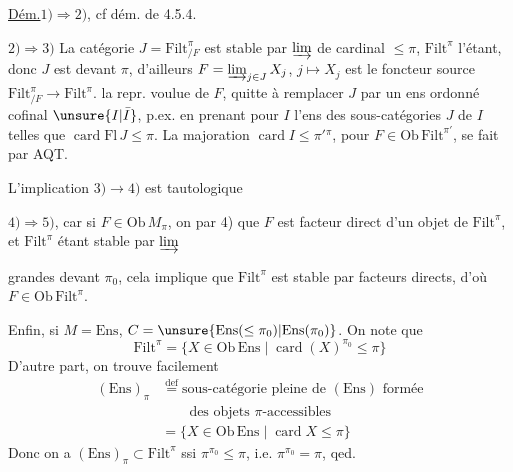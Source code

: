 \uline{Dém.}\quad $1)\Rightarrow2)$, cf dém. de 4.5.4.

$2)\Rightarrow3)$ La catégorie $J=\mathrm{Filt}^{\pi}_{/F}$ est stable par $\varinjlim$ de cardinal $\leq\pi$, $\mathrm{Filt}^{\pi}$ l'étant, donc $J$ est  devant $\pi$, d'ailleurs $F=\varinjlim_{j\in J}X_j$,  $j\longmapsto X_j$ est le foncteur source $\mathrm{Filt}^{\pi}_{/F}\longrightarrow\mathrm{Filt}^{\pi}$.  la repr. voulue de $F$, quitte à remplacer $J$ par un ens ordonné cofinal $\unsure{I|\bar I}$, p.ex. en prenant pour $I$ l'ens des sous-catégories   $J$ de $I$   \deleted{$\leq\pi$} telles que $\operatorname{card}\mathrm{Fl}\,J\leq\pi$. La majoration $\operatorname{card}I\leq\pi'{}^\pi$, pour $F\in\mathrm{Ob}\,\mathrm{Filt}^{\pi'}$, se fait par AQT.

L'implication $3)\longrightarrow4)$ est tautologique

$4)\Rightarrow5)$, car si $F\in\mathrm{Ob}\,M_\pi$, on  par 4) que $F$ est facteur direct d'un objet de $\mathrm{Filt}^{\pi}$, et $\mathrm{Filt}^{\pi}$ étant stable par $\varinjlim$

grandes devant $\pi_0$, cela implique que $\mathrm{Filt}^{\pi}$ est stable par facteurs directs, d'où $F\in\mathrm{Ob}\,\mathrm{Filt}^{\pi}$.

Enfin, si $M=\mathrm{Ens}$, $C=\unsure{\mathrm{Ens}(\leq\pi_0)|\mathrm{Ens}(\pi_0)}$. On note que
\[
\mathrm{Filt}^{\pi}=\{X\in\mathrm{Ob}\,\mathrm{Ens}\mid\operatorname{card}(X)^{\pi_0}\leq\pi\}
\]
D'autre part, on trouve facilement
\[
\begin{aligned}
(\mathrm{Ens})_\pi&\overset{\mathrm{def}}=\text{sous-catégorie pleine de }(\mathrm{Ens})\text{ formée}\\
&\qquad\text{des objets }\pi\text{-accessibles}\\
&=\{X\in\mathrm{Ob}\,\mathrm{Ens}\mid\operatorname{card}X\leq\pi\}
\end{aligned}
\]
Donc on a $(\mathrm{Ens})_\pi\subset\mathrm{Filt}^{\pi}$ ssi $\pi^{\pi_0}\leq\pi$, i.e. $\pi^{\pi_0}=\pi$, qed.

